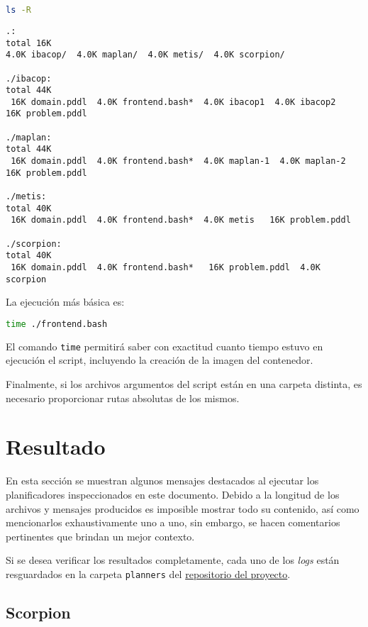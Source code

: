 \documentclass[a4paper,12pt,twocolumn]{article}
\begin{document}
\begin{lstlisting}[language=sh]
  ls -R                                                                                                
\end{lstlisting}

\begin{lstlisting}[style=consola]
.:
total 16K
4.0K ibacop/  4.0K maplan/  4.0K metis/  4.0K scorpion/

./ibacop:
total 44K
 16K domain.pddl  4.0K frontend.bash*  4.0K ibacop1  4.0K ibacop2   16K problem.pddl

./maplan:
total 44K
 16K domain.pddl  4.0K frontend.bash*  4.0K maplan-1  4.0K maplan-2   16K problem.pddl

./metis:
total 40K
 16K domain.pddl  4.0K frontend.bash*  4.0K metis   16K problem.pddl

./scorpion:
total 40K
 16K domain.pddl  4.0K frontend.bash*   16K problem.pddl  4.0K scorpion
\end{lstlisting}

La ejecución más básica es:

\begin{lstlisting}[language=sh]
  time ./frontend.bash
\end{lstlisting}

El comando \texttt{time} permitirá saber con exactitud cuanto tiempo estuvo en ejecución el script, incluyendo la creación de la imagen del contenedor.

Finalmente, si los archivos argumentos del script están en una carpeta distinta, es necesario proporcionar rutas absolutas de los mismos.
\section{Resultado}

En esta sección se muestran algunos mensajes destacados al ejecutar los planificadores inspeccionados en este documento. Debido a la longitud de los archivos y mensajes producidos es imposible mostrar todo su contenido, así como mencionarlos exhaustivamente uno a uno, sin embargo, se hacen comentarios pertinentes que brindan un mejor contexto.

Si se desea verificar los resultados completamente, cada uno de los \emph{logs} están resguardados en la carpeta \texttt{planners} del \href{https://gitlab.com/genomorro/unir/-/tree/RPA-01/}{repositorio del proyecto}.

\subsection{Scorpion}
\end{document}
